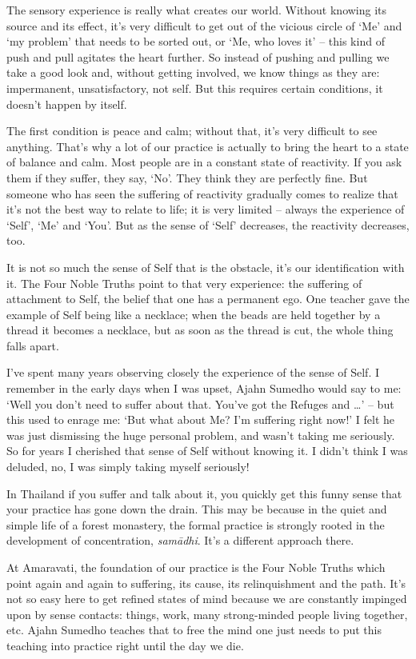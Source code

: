 The sensory experience is really what creates our world. Without knowing its source and its effect, it's very difficult to get out of the vicious circle of `Me' and `my problem' that needs to be sorted out, or `Me, who loves it' -- this kind of push and pull agitates the heart further. So instead of pushing and pulling we take a good look and, without getting involved, we know things as they are: impermanent, unsatisfactory, not self. But this requires certain conditions, it doesn't happen by itself.

The first condition is peace and calm; without that, it's very difficult to see anything. That's why a lot of our practice is actually to bring the heart to a state of balance and calm. Most people are in a constant state of reactivity. If you ask them if they suffer, they say, `No'. They think they are perfectly fine. But someone who has seen the suffering of reactivity gradually comes to realize that it's not the best way to relate to life; it is very limited -- always the experience of `Self', `Me' and `You'. But as the sense of `Self' decreases, the reactivity decreases, too.

It is not so much the sense of Self that is the obstacle, it's our identification with it. The Four Noble Truths point to that very experience: the suffering of attachment to Self, the belief that one has a permanent ego. One teacher gave the example of Self being like a necklace; when the beads are held together by a thread it becomes a necklace, but as soon as the thread is cut, the whole thing falls apart.

I've spent many years observing closely the experience of the sense of Self. I remember in the early days when I was upset, Ajahn Sumedho would say to me: `Well you don't need to suffer about that. You've got the Refuges and \ldots{}' -- but this used to enrage me: `But what about Me? I'm suffering right now!' I felt he was just dismissing the huge personal problem, and wasn't taking me seriously. So for years I cherished that sense of Self without knowing it. I didn't think I was deluded, no, I was simply taking myself seriously!

In Thailand if you suffer and talk about it, you quickly get this funny sense that your practice has gone down the drain. This may be because in the quiet and simple life of a forest monastery, the formal practice is strongly rooted in the development of concentration, \textit{sam\=adhi}. It's a different approach there.

At Amaravati, the foundation of our practice is the Four Noble Truths which point again and again to suffering, its cause, its relinquishment and the path. It's not so easy here to get refined states of mind because we are constantly impinged upon by sense contacts: things, work, many strong-minded people living together, etc. Ajahn Sumedho teaches that to free the mind one just needs to put this teaching into practice right until the day we die.

